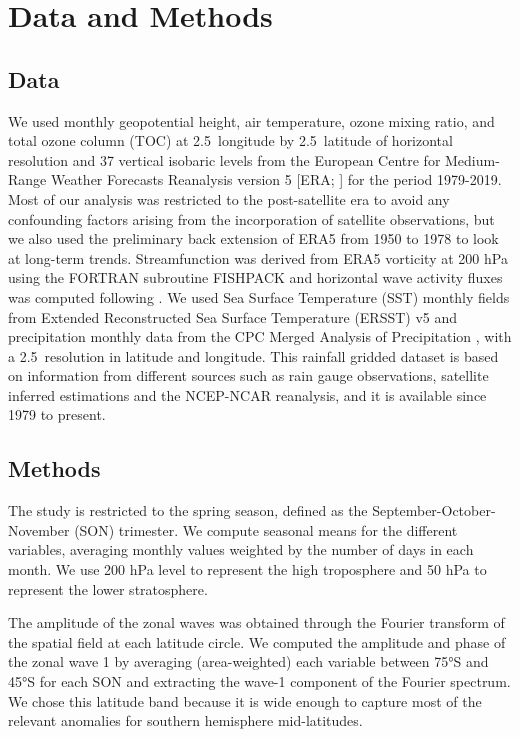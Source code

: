 \documentclass[smallextended]{svjour3}       %
\begin{document}
\hypertarget{methods}{%
\section{Data and Methods}\label{methods}}

\hypertarget{data}{%
\subsection{Data}\label{data}}

We used monthly geopotential height, air temperature, ozone mixing ratio, and total ozone column (TOC) at 2.5\degree~longitude by 2.5\degree~latitude of horizontal resolution and 37 vertical isobaric levels from the European Centre for Medium-Range Weather Forecasts Reanalysis version 5 {[}ERA; \citet{era5}{]} for the period 1979-2019. Most of our analysis was restricted to the post-satellite era to avoid any confounding factors arising from the incorporation of satellite observations, but we also used the preliminary back extension of ERA5 from 1950 to 1978 \citep{era5be} to look at long-term trends. Streamfunction was derived from ERA5 vorticity at 200 hPa using the FORTRAN subroutine FISHPACK \citep{fishpack} and horizontal wave activity fluxes was computed following \citet{plumb1985}. We used Sea Surface Temperature (SST) monthly fields from Extended Reconstructed Sea Surface Temperature (ERSST) v5 \citep{huang2017} and precipitation monthly data from the CPC Merged Analysis of Precipitation \citep{cmap}, with a 2.5\degree~resolution in latitude and longitude.
This rainfall gridded dataset is based on information from different sources such as rain gauge observations, satellite inferred estimations and the NCEP-NCAR reanalysis, and it is available since 1979 to present.

\hypertarget{methods-1}{%
\subsection{Methods}\label{methods-1}}

The study is restricted to the spring season, defined as the September-October-November (SON) trimester.
We compute seasonal means for the different variables, averaging monthly values weighted by the number of days in each month.
We use 200 hPa level to represent the high troposphere and 50 hPa to represent the lower stratosphere.

The amplitude of the zonal waves was obtained through the Fourier transform of the spatial field at each latitude circle.
We computed the amplitude and phase of the zonal wave 1 by averaging (area-weighted) each variable between 75°S and 45°S for each SON and extracting the wave-1 component of the Fourier spectrum.
We chose this latitude band because it is wide enough to capture most of the relevant anomalies for southern hemisphere mid-latitudes.
\end{document}
